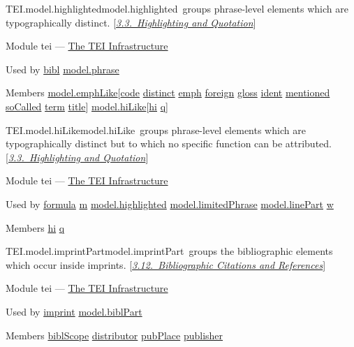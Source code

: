 \begin{reflist}
\item[]\begin{specHead}{TEI.model.highlighted}{model.highlighted} groups phrase-level elements which are typographically distinct. [\textit{\hyperref[COHQ]{3.3.\ Highlighting and Quotation}}]\end{specHead} 
    \item[{Module}]
  tei — \hyperref[ST]{The TEI Infrastructure}
    \item[{Used by}]
  \hyperref[TEI.bibl]{bibl} \hyperref[TEI.model.phrase]{model.phrase}
    \item[{Members}]
  \hyperref[TEI.model.emphLike]{model.emphLike}[\hyperref[TEI.code]{code} \hyperref[TEI.distinct]{distinct} \hyperref[TEI.emph]{emph} \hyperref[TEI.foreign]{foreign} \hyperref[TEI.gloss]{gloss} \hyperref[TEI.ident]{ident} \hyperref[TEI.mentioned]{mentioned} \hyperref[TEI.soCalled]{soCalled} \hyperref[TEI.term]{term} \hyperref[TEI.title]{title}] \hyperref[TEI.model.hiLike]{model.hiLike}[\hyperref[TEI.hi]{hi} \hyperref[TEI.q]{q}]
\end{reflist}  
\begin{reflist}
\item[]\begin{specHead}{TEI.model.hiLike}{model.hiLike} groups phrase-level elements which are typographically distinct but to which no specific function can be attributed. [\textit{\hyperref[COHQ]{3.3.\ Highlighting and Quotation}}]\end{specHead} 
    \item[{Module}]
  tei — \hyperref[ST]{The TEI Infrastructure}
    \item[{Used by}]
  \hyperref[TEI.formula]{formula} \hyperref[TEI.m]{m} \hyperref[TEI.model.highlighted]{model.highlighted} \hyperref[TEI.model.limitedPhrase]{model.limitedPhrase} \hyperref[TEI.model.linePart]{model.linePart} \hyperref[TEI.w]{w}
    \item[{Members}]
  \hyperref[TEI.hi]{hi} \hyperref[TEI.q]{q}
\end{reflist}  
\begin{reflist}
\item[]\begin{specHead}{TEI.model.imprintPart}{model.imprintPart} groups the bibliographic elements which occur inside imprints. [\textit{\hyperref[COBI]{3.12.\ Bibliographic Citations and References}}]\end{specHead} 
    \item[{Module}]
  tei — \hyperref[ST]{The TEI Infrastructure}
    \item[{Used by}]
  \hyperref[TEI.imprint]{imprint} \hyperref[TEI.model.biblPart]{model.biblPart}
    \item[{Members}]
  \hyperref[TEI.biblScope]{biblScope} \hyperref[TEI.distributor]{distributor} \hyperref[TEI.pubPlace]{pubPlace} \hyperref[TEI.publisher]{publisher}
\end{reflist}  
